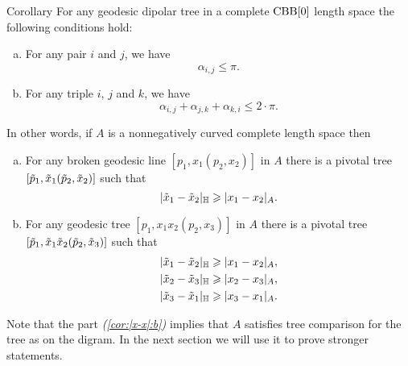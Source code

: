 \begin{thm}{Corollary}\label{cor:|x-x|}
For any geodesic dipolar tree  in a complete $\CBB[0]$ length space the following conditions hold:
\begin{enumerate}[(a)]
\item For any pair $i$ and $j$, we have
\[\alpha_{i,j}\le \pi.\]
\item For any triple $i$, $j$ and $k$,  we have
\[\alpha_{i,j}+\alpha_{j,k}+\alpha_{k,i}\le 2\cdot\pi.\]
\end{enumerate}
In other words, if $A$ is a nonnegatively curved complete length space then
\begin{enumerate}[(a)]
\item\label{cor:|x-x|:a} For any broken geodesic line $[p_1,x_1(p_2,x_2)]$ in  $A$ there is a pivotal tree $[\~p_1,\~x_1(\~p_2,\~x_2)]$ such that 
\[|\~x_1-\~x_2|_{\HH}\ge |x_1-x_2|_A.\]

\item\label{cor:|x-x|:b} For any geodesic tree $[p_1,x_1x_2(p_2,x_3)]$ in $A$ there is a pivotal tree $[\~p_1,\~x_1\~x_2(\~p_2,\~x_3)]$ such that 
\begin{align*}
|\~x_1-\~x_2|_{\HH}&\ge |x_1-x_2|_A,
\\
|\~x_2-\~x_3|_{\HH}&\ge |x_2-x_3|_A,
\\
|\~x_3-\~x_1|_{\HH}&\ge |x_3-x_1|_A.
\end{align*}
\end{enumerate}

\end{thm}
\begin{comment}
\begin{wrapfigure}{r}{15 mm}
\begin{tikzpicture}[scale=1,
  thick,main node/.style={circle,draw,font=\sffamily\bfseries,minimum size=3mm}]
  \node[main node] (1) at (0,0) {};
  \node[main node] (2) at (0,1){};
  \node[main node] (3) at (0,2){};
  \node[main node] (4) at (1,0) {};
  \node[main node] (5) at (1,1) {};
  

  \path[every node/.style={font=\sffamily\small}]
   (1) edge node[above]{}(2)
   (2) edge node[above]{}(3)
   (2) edge node[above]{}(5)
   (4) edge node[above]{}(5);
\end{tikzpicture}
\end{wrapfigure}
\end{comment}

Note that the part \textit{(\ref{cor:|x-x|:b})} implies that $A$ satisfies tree comparison for the tree as on the digram. 
In the next section we will use it to prove stronger statements.

